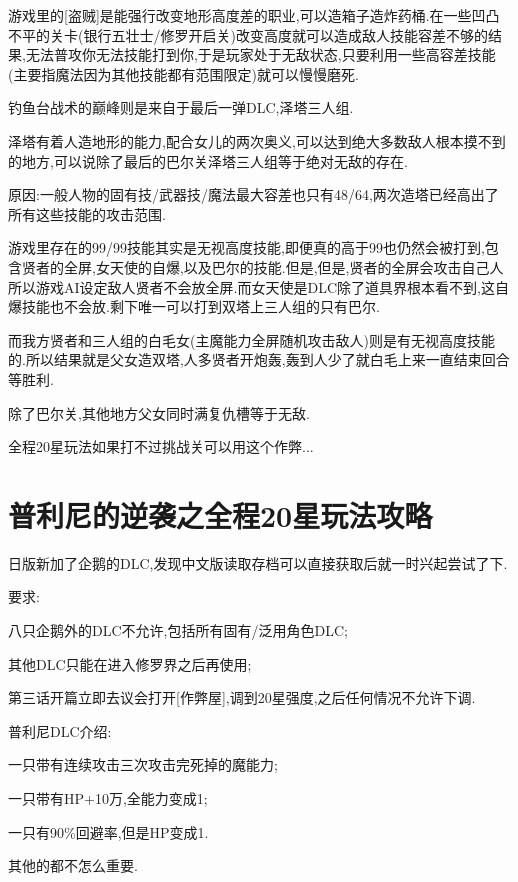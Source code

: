 \begin{enumerate}
		游戏里的[盗贼]是能强行改变地形高度差的职业,可以造箱子造炸药桶.在一些凹凸不平的关卡(银行五壮士/修罗开启关)改变高度就可以造成敌人技能容差不够的结果,无法普攻你无法技能打到你,于是玩家处于无敌状态,只要利用一些高容差技能(主要指魔法因为其他技能都有范围限定)就可以慢慢磨死.

		钓鱼台战术的巅峰则是来自于最后一弹DLC,泽塔三人组.

		泽塔有着人造地形的能力,配合女儿的两次奥义,可以达到绝大多数敌人根本摸不到的地方,可以说除了最后的巴尔关泽塔三人组等于绝对无敌的存在.

		原因:一般人物的固有技/武器技/魔法最大容差也只有48/64,两次造塔已经高出了所有这些技能的攻击范围.

		游戏里存在的99/99技能其实是无视高度技能,即便真的高于99也仍然会被打到,包含贤者的全屏,女天使的自爆,以及巴尔的技能.但是,但是,贤者的全屏会攻击自己人所以游戏AI设定敌人贤者不会放全屏.而女天使是DLC除了道具界根本看不到,这自爆技能也不会放.剩下唯一可以打到双塔上三人组的只有巴尔.

		而我方贤者和三人组的白毛女(主魔能力全屏随机攻击敌人)则是有无视高度技能的.所以结果就是父女造双塔,人多贤者开炮轰,轰到人少了就白毛上来一直结束回合等胜利.

		除了巴尔关,其他地方父女同时满复仇槽等于无敌.

		全程20星玩法如果打不过挑战关可以用这个作弊...

	\end{enumerate}
	
	\newpage

	\section{普利尼的逆袭之全程20星玩法攻略}

	日版新加了企鹅的DLC,发现中文版读取存档可以直接获取后就一时兴起尝试了下.

	要求:

	八只企鹅外的DLC不允许,包括所有固有/泛用角色DLC;

	其他DLC只能在进入修罗界之后再使用;

	第三话开篇立即去议会打开[作弊屋],调到20星强度,之后任何情况不允许下调.

	普利尼DLC介绍:

	一只带有连续攻击三次攻击完死掉的魔能力;

	一只带有HP+10万,全能力变成1;

	一只有90\%回避率,但是HP变成1.

	其他的都不怎么重要.

	\newpage

